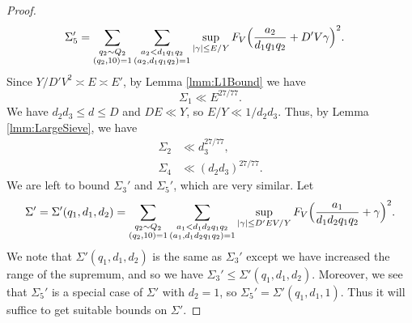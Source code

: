 \documentclass[10pt]{amsart}
\theoremstyle{plain}
\numberwithin{sblmm}{thrm}
\numberwithin{equation}{section}
\begin{document}
\begin{proof}
\begin{align*}
\Sigma_5'&=\sum_{\substack{q_2\sim Q_2\\ (q_2,10)=1}}\sum_{\substack{a_2< d_1q_1q_2\\ (a_2,d_1q_1q_2)=1}}\sup_{|\gamma|\le E/Y}F_V\Bigl(\frac{a_2}{d_1q_1q_2}+D' V\gamma\Bigr)^2.
\end{align*}
%
Since $Y/D' V^2\asymp E\asymp E'$, by Lemma \ref{lmm:L1Bound} we have
%
\begin{equation}
\Sigma_1\ll E^{27/77}. \label{eq:Sig1Bound}
\end{equation}
%
We have $d_2d_3\le d\le D$ and $DE\ll Y$, so $E/Y\ll 1/d_2d_3$. Thus, by Lemma \ref{lmm:LargeSieve},  we have
%
\begin{align}
%
\Sigma_2&\ll d_3^{27/77},\label{eq:Sig2Bound}\\
\Sigma_4&\ll (d_2d_3)^{27/77}.\label{eq:Sig4Bound}
\end{align}
%
We are left to bound $\Sigma_3'$ and $\Sigma_5'$, which are very similar. Let
\[
\Sigma'=\Sigma'(q_1,d_1,d_2)=\sum_{\substack{q_2\sim Q_2\\ (q_2,10)=1}}\sum_{\substack{a_1< d_1d_2q_1q_2\\ (a_1,d_1d_2q_1q_2)=1}}\sup_{|\gamma|\le D' E V/Y}F_{V}\Bigl(\frac{a_1}{d_1d_2q_1q_2}+\gamma\Bigr)^2.
\]
We note that $\Sigma'(q_1,d_1,d_2)$ is the same as $\Sigma_3'$ except we have increased the range of the supremum, and so we have $\Sigma_3'\le\Sigma'(q_1,d_1,d_2)$. Moreover, we see that $\Sigma_5'$ is a special case of $\Sigma'$ with $d_2=1$, so $\Sigma_5'=\Sigma'(q_1,d_1,1)$. Thus it will suffice to get suitable bounds on $\Sigma'$.


\end{proof}
\end{document}

